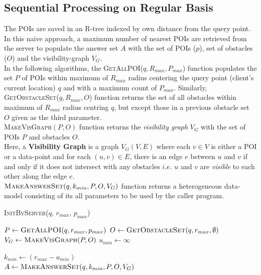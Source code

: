 \documentclass{sig-alternate}
\begin{document}
\subsection{Sequential Processing on Regular Basis}
The POIs are saved in an R-tree indexed by own distance from the query point. In this naive approach, a maximum number of nearest POIs are retrieved from the server to populate the answer set $A$ with the set of POIs ($p$), set of obstacles ($O$) and the visibility-graph $V_G$.\\
In the following algorithms, the \textsc{GetAllPOI}($q, R_{max},P_{max}$) function populates the set $P$ of POIs within maximum of $R_{max}$ radius centering the query point (client's current location) $q$ and with a maximum count of $P_{max}$. Similarly, \textsc{GetObstacleSet}($q, R_{max},O$) function returns the set of all obstacles within maximum of $R_{max}$ radius centring $q$, but except those in a previous obstacle set $O$ given as the third parameter. \\\textsc{MakeVisGraph}$(P,O)$ function returns the \textit{visibility graph} $V_G$ with the set of POIs $P$ and obstacles $O$.\\
Here, a \textbf{Visibility Graph} is a graph $V_G(V,E)$ where each $v \in V$ is either a POI or a data-point and for each $(u,v) \in E$, there is an edge $e$ between $u$ and $v$ if and only if it does not intersect with any obstacles $i.e.$ $u$ and $v$ are \textit{visible} to each other along the edge $e$. \\
$\textsc{MakeAnswerSet}(q, k_{min}, P, O, V_G)$ function returns a heterogeneous data-model consisting of its all parameters to be used by the caller program.

\DontPrintSemicolon
\begin{algorithm}
\caption{\textsc{InitByServer}($q$, $r_{max}$, $p_{max}$)}
	
	 $P \gets \textsc{GetAllPOI}(q, r_{max}, p_{max})$ \;
	 $O \gets \textsc{GetObstacleSet}(q, r_{max}, \emptyset)$ \;
	 $V_G \gets \textsc{MakeVisGraph}(P, O)$ \;
	 $u_{min} \gets \infty$\;
	
	$k_{min} \gets (r_{max} - u_{min})$ \\
	\Return $A \gets \textsc{MakeAnswerSet}(q, k_{min}, P, O, V_G)$ \;
\label{InitByServer}
\end{algorithm}
\end{document}
